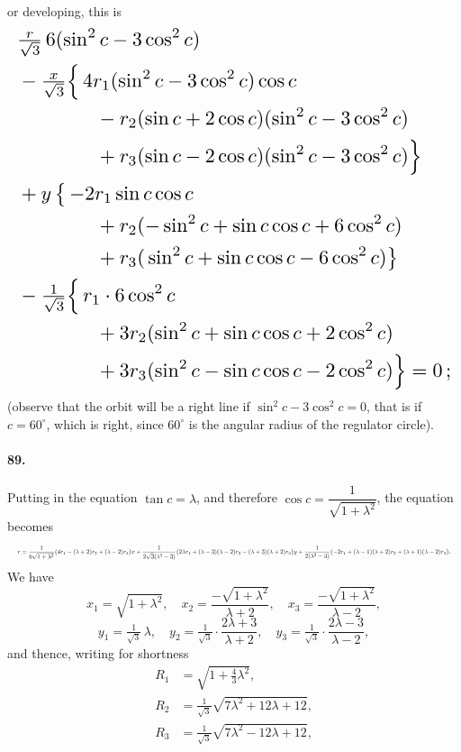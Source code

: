 \documentclass[11pt]{article}
\begin{document}
\medskip

or developing, this is
\[
\resizebox{\textwidth}{!}{$\displaystyle
\begin{aligned}
&\tfrac{r}{\sqrt{3}}\,6(\sin^{2}c - 3\cos^{2}c)\\
&-\tfrac{x}{\sqrt{3}}\Bigl\{\,4r_{1}(\sin^{2}c - 3\cos^{2}c)\cos c\\
&\hspace{1.4cm} - r_{2}(\sin c + 2\cos c)(\sin^{2}c - 3\cos^{2}c)\\
&\hspace{1.4cm} + r_{3}(\sin c - 2\cos c)(\sin^{2}c - 3\cos^{2}c)\Bigr\}\\
&+y\,\bigl\{\,-2r_{1}\sin c\cos c\\
&\hspace{1.4cm} + r_{2}(-\sin^{2}c + \sin c\cos c + 6\cos^{2}c)\\
&\hspace{1.4cm} + r_{3}(\,\sin^{2}c + \sin c\cos c - 6\cos^{2}c)\bigr\}\\
&-\tfrac{1}{\sqrt{3}}\Bigl\{\,r_{1}\cdot 6\cos^{2}c\\
&\hspace{1.4cm} + 3r_{2}(\sin^{2}c + \sin c\cos c + 2\cos^{2}c)\\
&\hspace{1.4cm} + 3r_{3}(\sin^{2}c - \sin c\cos c - 2\cos^{2}c)\Bigr\} = 0\,;
\end{aligned}$}
\]
(observe that the orbit will be a right line if $\sin^{2}c - 3\cos^{2}c = 0$, that is if $c = 60^{\circ}$, which is right, since $60^{\circ}$ is the angular radius of the regulator circle).

\paragraph{89.} Putting in the equation $\tan c = \lambda$, and therefore $\cos c = \dfrac{1}{\sqrt{1 + \lambda^{2}}}$, the equation becomes
\[
\resizebox{\textwidth}{!}{$\displaystyle
r = \dfrac{1}{6\sqrt{1 + \lambda^{2}}}\bigl(4r_{1} - (\lambda + 2)r_{2} + (\lambda - 2)r_{3}\bigr)x
+ \dfrac{1}{2\sqrt{3}(\lambda^{2} - 3)}\bigl(2\lambda r_{1} + (\lambda - 3)(\lambda - 2)r_{2} - (\lambda + 3)(\lambda + 2)r_{3}\bigr)y
+ \dfrac{1}{2(\lambda^{2} - 3)}\bigl(-2r_{1} + (\lambda - 1)(\lambda + 2)r_{2} + (\lambda + 1)(\lambda - 2)r_{3}\bigr).
$}
\]
We have
\[
x_{1} = \sqrt{1 + \lambda^{2}},\quad x_{2} = \dfrac{-\sqrt{1 + \lambda^{2}}}{\lambda + 2},\quad x_{3} = \dfrac{-\sqrt{1 + \lambda^{2}}}{\lambda - 2},
\]
\[
y_{1} = \tfrac{1}{\sqrt{3}}\,\lambda,\quad y_{2} = \tfrac{1}{\sqrt{3}}\cdot\dfrac{2\lambda + 3}{\lambda + 2},\quad y_{3} = \tfrac{1}{\sqrt{3}}\cdot\dfrac{2\lambda - 3}{\lambda - 2},
\]
and thence, writing for shortness
\[
\begin{aligned}
R_{1} &= \sqrt{1 + \tfrac{4}{3}\lambda^{2}},\\
R_{2} &= \tfrac{1}{\sqrt{3}}\sqrt{7\lambda^{2} + 12\lambda + 12},\\
R_{3} &= \tfrac{1}{\sqrt{3}}\sqrt{7\lambda^{2} - 12\lambda + 12},
\end{aligned}
\]
\end{document}
